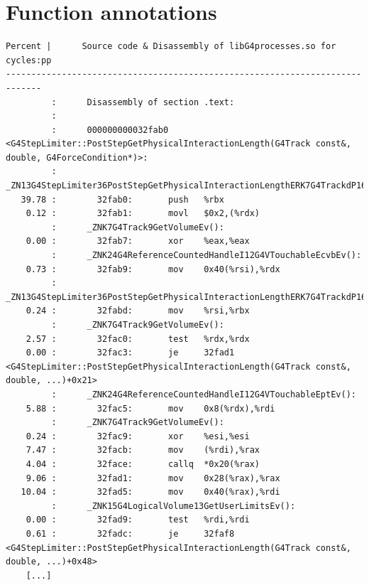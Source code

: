 \documentclass[a4paper]{jpconf}
\begin{document}
\newpage
\newpage
\begin{appendices}
\label{appendix:function-recordings}
\section{Function annotations}
\begin{minipage}{\linewidth}
\begin{lstlisting}[language={[x64]Assembler}, basicstyle=\ttfamily\tiny, 
caption=G4StepLimiter::PostStepGetPhysicalInteractionLength cycles annotation]
Percent |      Source code & Disassembly of libG4processes.so for  cycles:pp
-----------------------------------------------------------------------------
         :      Disassembly of section .text:
         :
         :      000000000032fab0 <G4StepLimiter::PostStepGetPhysicalInteractionLength(G4Track const&, double, G4ForceCondition*)>:
         :      _ZN13G4StepLimiter36PostStepGetPhysicalInteractionLengthERK7G4TrackdP16G4ForceCondition():
   39.78 :        32fab0:       push   %rbx
    0.12 :        32fab1:       movl   $0x2,(%rdx)
         :      _ZNK7G4Track9GetVolumeEv():
    0.00 :        32fab7:       xor    %eax,%eax
         :      _ZNK24G4ReferenceCountedHandleI12G4VTouchableEcvbEv():
    0.73 :        32fab9:       mov    0x40(%rsi),%rdx
         :      _ZN13G4StepLimiter36PostStepGetPhysicalInteractionLengthERK7G4TrackdP16G4ForceCondition():
    0.24 :        32fabd:       mov    %rsi,%rbx
         :      _ZNK7G4Track9GetVolumeEv():
    2.57 :        32fac0:       test   %rdx,%rdx
    0.00 :        32fac3:       je     32fad1 <G4StepLimiter::PostStepGetPhysicalInteractionLength(G4Track const&, double, ...)+0x21>
         :      _ZNK24G4ReferenceCountedHandleI12G4VTouchableEptEv():
    5.88 :        32fac5:       mov    0x8(%rdx),%rdi
         :      _ZNK7G4Track9GetVolumeEv():
    0.24 :        32fac9:       xor    %esi,%esi
    7.47 :        32facb:       mov    (%rdi),%rax
    4.04 :        32face:       callq  *0x20(%rax)
    9.06 :        32fad1:       mov    0x28(%rax),%rax
   10.04 :        32fad5:       mov    0x40(%rax),%rdi
         :      _ZNK15G4LogicalVolume13GetUserLimitsEv():
    0.00 :        32fad9:       test   %rdi,%rdi
    0.61 :        32fadc:       je     32faf8 <G4StepLimiter::PostStepGetPhysicalInteractionLength(G4Track const&, double, ...)+0x48>
    [...]
\end{lstlisting}
\end{minipage}


\end{appendices}
\end{document}
